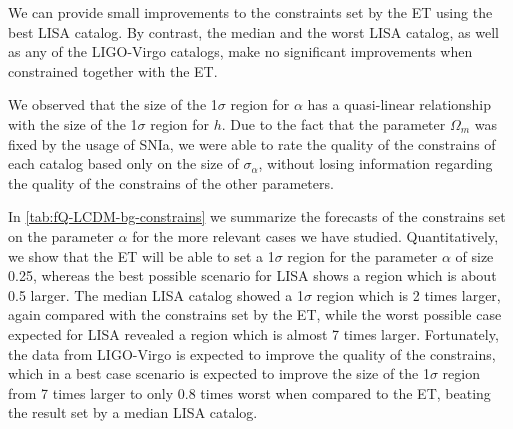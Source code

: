 We can provide small improvements to the constraints set by the \gls{ET} using the best \gls{LISA} catalog. By contrast, the median and the worst \gls{LISA} catalog, as well as any of the \gls{LIGO}-Virgo catalogs, make no significant improvements when constrained together with the \gls{ET}.

We observed that the size of the 1$\sigma$ region for $\alpha$ has a quasi-linear relationship with the size of the 1$\sigma$ region for $h$. Due to the fact that the parameter $\Omega_m$ was fixed by the usage of \gls{SNIa}, we were able to rate the quality of the constrains of each catalog based only on the size of $\sigma_\alpha$, without losing information regarding the quality of the constrains of the other parameters.

In \cref{tab:fQ-LCDM-bg-constrains} we summarize the forecasts of the constrains set on the parameter $\alpha$ for the more relevant cases we have studied. Quantitatively, we show that the \gls{ET} will be able to set a 1$\sigma$ region for the parameter $\alpha$ of size 0.25, whereas the best possible scenario for \gls{LISA} shows a region which is about 0.5 larger. The median \gls{LISA} catalog showed a 1$\sigma$ region which is 2 times larger, again compared with the constrains set by the \gls{ET}, while the worst possible case expected for \gls{LISA} revealed a region which is almost 7 times larger. Fortunately, the data from \gls{LIGO}-Virgo is expected to improve the quality of the constrains, which in a best case scenario is expected to improve the size of the 1$\sigma$ region from 7 times larger to only 0.8 times worst when compared to the \gls{ET}, beating the result set by a median \gls{LISA} catalog.
